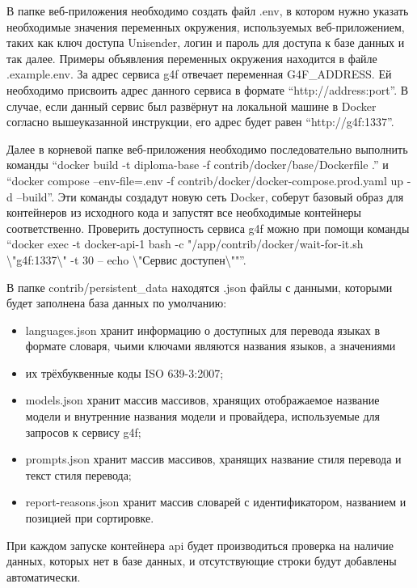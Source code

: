 
В папке веб-приложения необходимо создать файл .env, в котором нужно указать необходимые значения переменных окружения, используемых веб-приложением, таких как ключ доступа Unisender, логин и пароль для доступа к базе данных и так далее. Примеры объявления переменных окружения находится в файле .example.env. За адрес сервиса g4f отвечает переменная G4F\_ADDRESS. Ей необходимо присвоить адрес данного сервиса в формате “http://address:port”. В случае, если данный сервис был развёрнут на локальной машине в Docker согласно вышеуказанной инструкции, его адрес будет равен “http://g4f:1337”.

Далее в корневой папке веб-приложения необходимо последовательно выполнить команды “docker build -t diploma-base -f contrib/docker/base/Dockerfile .” и “docker compose --env-file=.env -f contrib/docker/docker-compose.prod.yaml up -d --build”. Эти команды создадут новую сеть Docker, соберут базовый образ для контейнеров из исходного кода и запустят все необходимые контейнеры соответственно. Проверить доступность сервиса g4f можно при помощи команды “docker exec -t docker-api-1 bash -c "/app/contrib/docker/wait-for-it.sh \textbackslash"g4f:1337\textbackslash" -t 30 -- echo \textbackslash"Сервис доступен\textbackslash""”.

В папке contrib/persistent\_data находятся .json файлы с данными, которыми будет заполнена база данных по умолчанию:

\begin{itemize}
    \item languages.json хранит информацию о доступных для перевода языках в формате словаря, чьими ключами являются названия языков, а значениями     \item их трёхбуквенные коды ISO 639-3:2007;
    \item models.json хранит массив массивов, хранящих отображаемое название модели и внутренние названия модели и провайдера, используемые для запросов к сервису g4f;
    \item prompts.json хранит массив массивов, хранящих название стиля перевода и текст стиля перевода;
    \item report-reasons.json хранит массив словарей с идентификатором, названием и позицией при сортировке.
\end{itemize}

При каждом запуске контейнера api будет производиться проверка на наличие данных, которых нет в базе данных, и отсутствующие строки будут добавлены автоматически.

